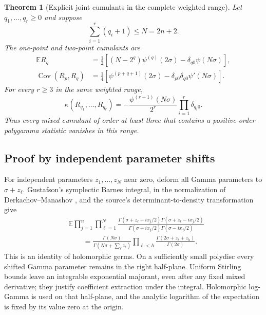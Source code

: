 \documentclass[11pt,a4paper]{article}
\numberwithin{equation}{section}
\newtheorem{theorem}{Theorem}[section]
\theoremstyle{definition}
\theoremstyle{remark}
\begin{document}
\begin{theorem}[Explicit joint cumulants in the complete weighted range]
\label{gc:main}
Let $q_1,\ldots,q_r\ge0$ and suppose
\begin{equation}\label{gc:range}
                   \sum_{i=1}^r(q_i+1)\le N=2n+2.
\end{equation}
The one-point and two-point cumulants are
\begin{align}
 \mathbb E R_q
   &=\frac12\left[(N-2^q)\psi^{(q)}(2\sigma)
               -\delta_{q0}\psi(N\sigma)\right],
              \label{gc:mean}\\
 \operatorname{Cov}(R_p,R_q)
   &=\frac14\left[\psi^{(p+q+1)}(2\sigma)
               -\delta_{p0}\delta_{q0}\psi'(N\sigma)\right].
              \label{gc:cov}
\end{align}
For every $r\ge3$ in the same weighted range,
\begin{equation}\label{gc:higher}
 \boxed{\quad
 \kappa(R_{q_1},\ldots,R_{q_r})
 =-\frac{\psi^{(r-1)}(N\sigma)}{2^r}
                    \prod_{i=1}^r\delta_{q_i0}.
 \quad}
\end{equation}
Thus every mixed cumulant of order at least three that contains a
positive-order polygamma statistic vanishes in this range.
\end{theorem}

\subsection{Proof by independent parameter shifts}

For independent parameters $z_1,\ldots,z_N$ near zero, deform all Gamma
parameters to $\sigma+z_\ell$. Gustafson's symplectic Barnes integral,
in the normalization of Derkachov--Manashov \cite[Eq.~(2)]{DerkachovManashov}, and the
source's determinant-to-density transformation give
\begin{equation}\label{gc:unpaired}
\begin{split}
 &\mathbb E\prod_{j=1}^n\prod_{\ell=1}^N
 \frac{\Gamma(\sigma+z_\ell+ix_j/2)
       \Gamma(\sigma+z_\ell-ix_j/2)}
      {\Gamma(\sigma+ix_j/2)\Gamma(\sigma-ix_j/2)}\\
 &\qquad=
 \frac{\Gamma(N\sigma)}{\Gamma(N\sigma+\sum_\ell z_\ell)}
 \prod_{\ell<h}
       \frac{\Gamma(2\sigma+z_\ell+z_h)}{\Gamma(2\sigma)}.
\end{split}
\end{equation}
This is an identity of holomorphic germs. On a sufficiently small
polydisc every shifted Gamma parameter remains in the right half-plane.
Uniform Stirling bounds leave an integrable exponential majorant, even
after any fixed mixed derivative; they justify coefficient extraction
under the integral. Holomorphic log-Gamma is used on that half-plane,
and the analytic logarithm of the expectation is fixed by its value
zero at the origin.
\end{document}
